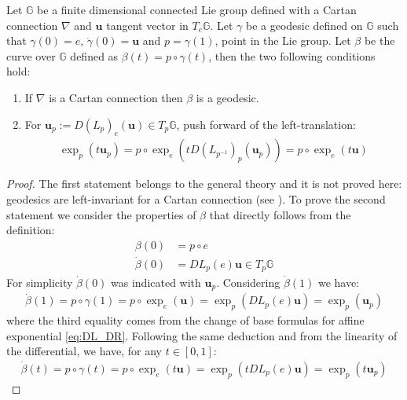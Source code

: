 \begin{prop}
	Let $\mathbb{G}$ be a finite dimensional connected Lie group defined with a Cartan connection $\nabla$ and $\mathbf{u}$ tangent vector in $ T_{e}\mathbb{G}$. Let $\gamma$ be a geodesic defined on $\mathbb{G}$ such that $\gamma(0) = e$, $\dot{\gamma}(0) =\mathbf{u}$ and $p = \gamma(1)$, point in the Lie group. Let $\beta$ be the curve over $\mathbb{G}$ defined as $\beta(t) = p\circ \gamma(t)$, then the two following conditions hold:
	\begin{enumerate}
		\item If $\nabla$ is a Cartan connection then $\beta$ is a geodesic.
		\item For $\mathbf{u}_{p} := D(L_{p})_{e}(\mathbf{u}) \in T_{p}\mathbb{G}$, push forward of the left-translation:
		\begin{align}\label{eq:lemma_pt}
		\exp_{p}(t\mathbf{u}_{p}) = p\circ \exp_{e}( t D(L_{p^{-1}})_{p}(\mathbf{u}_{p}) ) 
		= p\circ \exp_{e}(t\mathbf{u})
		\end{align}
	\end{enumerate}
\end{prop}
\begin{proof}
	The first statement belongs to the general theory and it is not proved here: geodesics are left-invariant for a Cartan connection (see \cite{do1992riemannian}). To prove the second statement we consider the properties of $\beta$ that directly follows from the definition:
	\begin{align*}
		\beta(0) &= p\circ e\\
		\dot{\beta}(0) &= DL_{p}(e)\mathbf{u}\in T_{p}\mathbb{G}
	\end{align*}
	For simplicity $\dot{\beta}(0) $ was indicated with $\mathbf{u}_{p}$. Considering $\dot{\beta}(1)$ we have: 
	\begin{align*}
	\dot{\beta}(1) = p\circ \gamma(1) 
						= p\circ \exp_{e}(\mathbf{u}) 
						= \exp_{p}( DL_p(e) \mathbf{u} ) 
						= \exp_{p}( \mathbf{u}_{p} ) 
	\end{align*}
	where the third equality comes from the change of base formulas for affine exponential \ref{eq:DL_DR}. Following the same deduction and from the linearity of the differential, we have, for any $t\in [ 0,1 ]$:
	\begin{align*}
	\dot{\beta}(t) = p\circ \gamma(t) 
	= p\circ \exp_{e}(t\mathbf{u}) 
	= \exp_{p}( tDL_p(e) \mathbf{u} ) 
	= \exp_{p}( t\mathbf{u}_{p} ) 
	\end{align*}
\end{proof}

